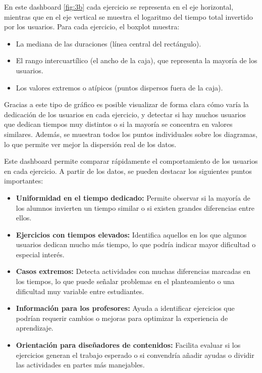 \documentclass[a4paper, 12pt]{book}
\begin{document}
En este dashboard \ref{fig:3b} cada ejercicio se representa en el eje horizontal, mientras que en el eje vertical se muestra el logaritmo del tiempo total invertido por los usuarios. Para cada ejercicio, el boxplot muestra:

\begin{itemize}

 \item La mediana de las duraciones (línea central del rectángulo).
 \item El rango intercuartílico (el ancho de la caja), que representa la mayoría de los usuarios.
 \item Los valores extremos o atípicos (puntos dispersos fuera de la caja).
  
\end{itemize}
Gracias a este tipo de gráfico es posible visualizar de forma clara cómo varía la dedicación de los usuarios en cada ejercicio, y detectar si hay muchos usuarios que dedican tiempos muy distintos o si la mayoría se concentra en valores similares. Además, se muestran todos los puntos individuales sobre los diagramas, lo que permite ver mejor la dispersión real de los datos.

Este dashboard permite comparar rápidamente el comportamiento de los usuarios en cada ejercicio. A partir de los datos, se pueden destacar los siguientes puntos importantes:

\begin{itemize}
  \item \textbf{Uniformidad en el tiempo dedicado:} Permite observar si la mayoría de los alumnos invierten un tiempo similar o si existen grandes diferencias entre ellos.

  \item \textbf{Ejercicios con tiempos elevados:} Identifica aquellos en los que algunos usuarios dedican mucho más tiempo, lo que podría indicar mayor dificultad o especial interés.

  \item \textbf{Casos extremos:} Detecta actividades con muchas diferencias marcadas en los tiempos, lo que puede señalar problemas en el planteamiento o una dificultad muy variable entre estudiantes.

  \item \textbf{Información para los profesores:} Ayuda a identificar ejercicios que podrían requerir cambios o mejoras para optimizar la experiencia de aprendizaje.

  \item \textbf{Orientación para diseñadores de contenidos:} Facilita evaluar si los ejercicios generan el trabajo esperado o si convendría añadir ayudas o dividir las actividades en partes más manejables.
\end{itemize}
\end{document}

